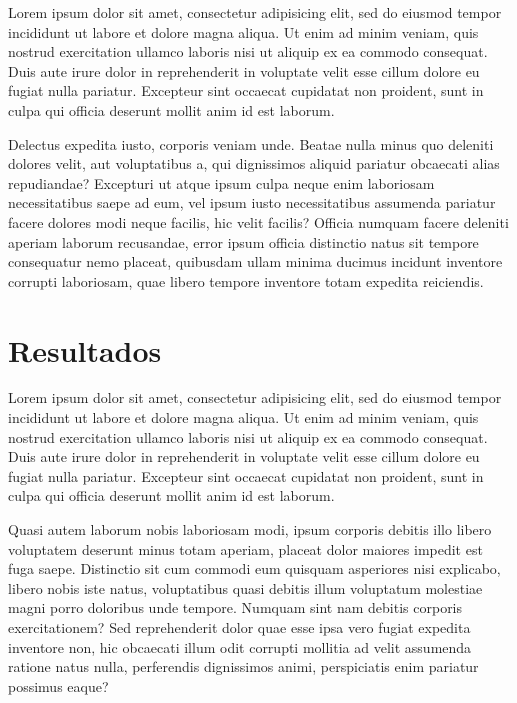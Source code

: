 \documentclass[
    12pt,               %
    openright,          %
    twoside,            %
    a4paper,            %
    chapter=TITLE,     %
    english,            %
    spanish,            %
    portuguese              %
    ]{abntex2}
\begin{document}
Lorem ipsum dolor sit amet, consectetur adipisicing elit, sed do eiusmod tempor incididunt ut labore et dolore magna aliqua. Ut enim ad minim veniam, quis nostrud exercitation ullamco laboris nisi ut aliquip ex ea commodo consequat. Duis aute irure dolor in reprehenderit in voluptate velit esse cillum dolore eu fugiat nulla pariatur. Excepteur sint occaecat cupidatat non proident, sunt in culpa qui officia deserunt mollit anim id est laborum.


Delectus expedita iusto, corporis veniam unde. Beatae nulla minus quo deleniti dolores velit, aut voluptatibus a, qui dignissimos aliquid pariatur obcaecati alias repudiandae? Excepturi ut atque ipsum culpa neque enim laboriosam necessitatibus saepe ad eum, vel ipsum iusto necessitatibus assumenda pariatur facere dolores modi neque facilis, hic velit facilis? Officia numquam facere deleniti aperiam laborum recusandae, error ipsum officia distinctio natus sit tempore consequatur nemo placeat, quibusdam ullam minima ducimus incidunt inventore corrupti laboriosam, quae libero tempore inventore totam expedita reiciendis.



\chapter{Resultados}

Lorem ipsum dolor sit amet, consectetur adipisicing elit, sed do eiusmod tempor incididunt ut labore et dolore magna aliqua. Ut enim ad minim veniam, quis nostrud exercitation ullamco laboris nisi ut aliquip ex ea commodo consequat. Duis aute irure dolor in reprehenderit in voluptate velit esse cillum dolore eu fugiat nulla pariatur. Excepteur sint occaecat cupidatat non proident, sunt in culpa qui officia deserunt mollit anim id est laborum.


Quasi autem laborum nobis laboriosam modi, ipsum corporis debitis illo libero voluptatem deserunt minus totam aperiam, placeat dolor maiores impedit est fuga saepe. Distinctio sit cum commodi eum quisquam asperiores nisi explicabo, libero nobis iste natus, voluptatibus quasi debitis illum voluptatum molestiae magni porro doloribus unde tempore. Numquam sint nam debitis corporis exercitationem? Sed reprehenderit dolor quae esse ipsa vero fugiat expedita inventore non, hic obcaecati illum odit corrupti mollitia ad velit assumenda ratione natus nulla, perferendis dignissimos animi, perspiciatis enim pariatur possimus eaque?
\end{document}
